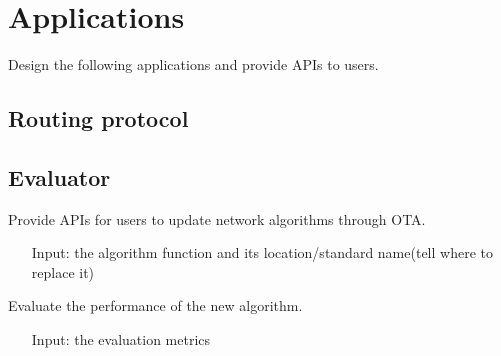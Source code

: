 \section{Applications}

Design the following applications and provide APIs to users.

\subsection{Routing protocol}

\iffalse
\subsection{Evaluator}

Provide APIs for users to update network algorithms through OTA.
\begin{itemize}
\item[Input:] the algorithm function and its location/standard name(tell where to replace it) 
\end{itemize}

Evaluate the performance of the new algorithm.
\begin{itemize}
\item[Input:] the evaluation metrics
\end{itemize}

